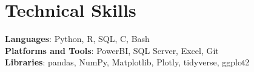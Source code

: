 \documentclass[letterpaper,11pt]{article}
\begin{document}
\section{Technical Skills}
 \begin{itemize}[leftmargin=0.15in, label={}]
    \small{\item{
     \textbf{Languages}{: Python, R, SQL, C, Bash} \\
     \textbf{Platforms and Tools}{: PowerBI, SQL Server, Excel, Git} \\
     \textbf{Libraries}{: pandas, NumPy, Matplotlib, Plotly, tidyverse, ggplot2} \\
    }}
 \end{itemize}

 
\end{document}
